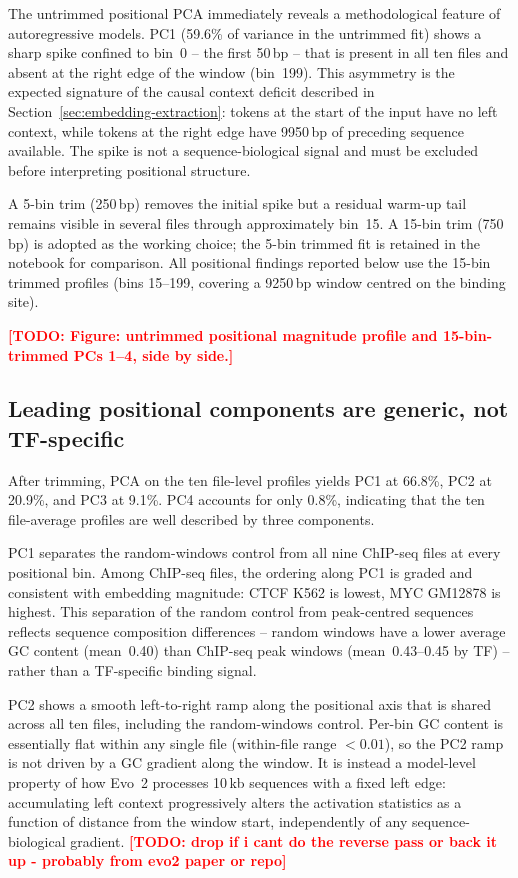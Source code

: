 \documentclass[12pt,a4paper,twoside,final]{book}
\newcommand{\todo}[1]{\textcolor{red}{\textbf{[TODO: #1]}}}
\begin{document}
The untrimmed positional PCA immediately reveals a methodological feature of autoregressive models.
PC1 (59.6\% of variance in the untrimmed fit) shows a sharp spike confined to bin~0 -- the first 50\,bp -- that is present in all ten files and absent at the right edge of the window (bin~199).
This asymmetry is the expected signature of the causal context deficit described in Section~\ref{sec:embedding-extraction}: tokens at the start of the input have no left context, while tokens at the right edge have 9950\,bp of preceding sequence available.
The spike is not a sequence-biological signal and must be excluded before interpreting positional structure. %

A 5-bin trim (250\,bp) removes the initial spike but a residual warm-up tail remains visible in several files through approximately bin~15. %
A 15-bin trim (750\,bp) is adopted as the working choice; the 5-bin trimmed fit is retained in the notebook for comparison. %
All positional findings reported below use the 15-bin trimmed profiles (bins 15--199, covering a 9250\,bp window centred on the binding site).

\todo{Figure: untrimmed positional magnitude profile and 15-bin-trimmed PCs 1--4, side by side.} %

\subsection{Leading positional components are generic, not TF-specific}

After trimming, PCA on the ten file-level profiles yields PC1 at 66.8\%, PC2 at 20.9\%, and PC3 at 9.1\%.
PC4 accounts for only 0.8\%, indicating that the ten file-average profiles are well described by three components.

PC1 separates the random-windows control from all nine ChIP-seq files at every positional bin. 
Among ChIP-seq files, the ordering along PC1 is graded and consistent with embedding magnitude: CTCF K562 is lowest, MYC GM12878 is highest.
This separation of the random control from peak-centred sequences reflects sequence composition differences -- random windows have a lower average GC content (mean~0.40) than ChIP-seq peak windows (mean~0.43--0.45 by TF) -- rather than a TF-specific binding signal. %

PC2 shows a smooth left-to-right ramp along the positional axis that is shared across all ten files, including the random-windows control.
Per-bin GC content is essentially flat within any single file (within-file range $<0.01$), so the PC2 ramp is not driven by a GC gradient along the window. %
It is instead a model-level property of how Evo~2 processes 10\,kb sequences with a fixed left edge: accumulating left context progressively alters the activation statistics as a function of distance from the window start, independently of any sequence-biological gradient. %
\todo{drop if i cant do the reverse pass or back it up - probably from evo2 paper or repo}
\end{document}
